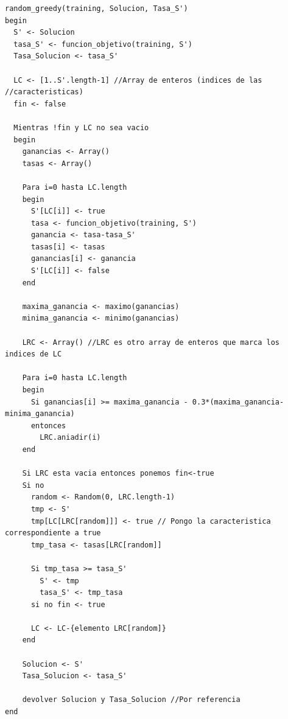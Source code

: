 \begin{lstlisting}
random_greedy(training, Solucion, Tasa_S')
begin
  S' <- Solucion
  tasa_S' <- funcion_objetivo(training, S')
  Tasa_Solucion <- tasa_S'
  
  LC <- [1..S'.length-1] //Array de enteros (indices de las                     //caracteristicas)
  fin <- false
  
  Mientras !fin y LC no sea vacio
  begin
    ganancias <- Array()
    tasas <- Array()
    
    Para i=0 hasta LC.length
    begin
      S'[LC[i]] <- true
      tasa <- funcion_objetivo(training, S')
      ganancia <- tasa-tasa_S'
      tasas[i] <- tasas
      ganancias[i] <- ganancia
      S'[LC[i]] <- false
    end
    
    maxima_ganancia <- maximo(ganancias)
    minima_ganancia <- minimo(ganancias)
    
    LRC <- Array() //LRC es otro array de enteros que marca los indices de LC
    
    Para i=0 hasta LC.length
    begin
      Si ganancias[i] >= maxima_ganancia - 0.3*(maxima_ganancia-minima_ganancia)
      entonces
        LRC.aniadir(i)
    end
    
    Si LRC esta vacia entonces ponemos fin<-true
    Si no
      random <- Random(0, LRC.length-1)
      tmp <- S'
      tmp[LC[LRC[random]]] <- true // Pongo la caracteristica correspondiente a true
      tmp_tasa <- tasas[LRC[random]]
      
      Si tmp_tasa >= tasa_S'
        S' <- tmp
        tasa_S' <- tmp_tasa
      si no fin <- true
      
      LC <- LC-{elemento LRC[random]}
    end
    
    Solucion <- S'
    Tasa_Solucion <- tasa_S'
    
    devolver Solucion y Tasa_Solucion //Por referencia
end
\end{lstlisting}

